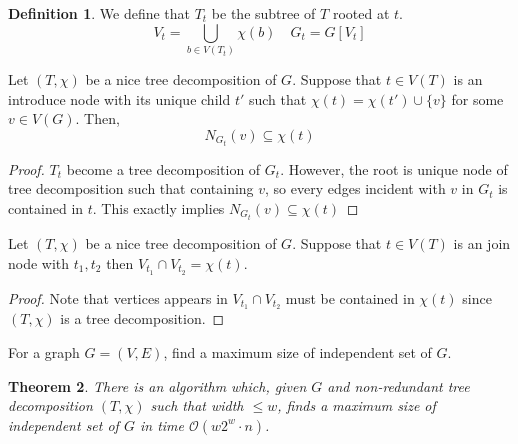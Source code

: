 \documentclass[12pt, a4paper, openany, twoside]{book}
\newtheorem{thm}{Theorem}[chapter]
\theoremstyle{definition}
\newtheorem{defn}[thm]{Definition}
\theoremstyle{remark}
\newcommand{\CO}{{\mathcal {O}}} \newcommand{\CP}{{\mathcal {P}}}
\theoremstyle{plain}
\numberwithin{equation}{section}
\begin{document}
\begin{defn}
    We define that $T_t$ be the subtree of $T$ rooted at $t$. 
    \[V_t = \bigcup_{b \in V(T_t)} \chi(b) \quad G_t = G[V_t]\]
\end{defn}

\begin{tcolorbox}[colback=yellow!10!white,colframe=blue!75!black,title=Lemma]

Let $(T, \chi)$ be a nice tree decomposition of $G$. Suppose that $t \in V(T)$ is an 
introduce node with its unique child $t'$ such that $\chi(t) = \chi(t') \cup \{v\}$ for some $v \in V(G)$. 
Then, 
\[N_{G_t}(v) \subseteq \chi(t)\]

\end{tcolorbox}

\begin{proof}
    $T_t$ become a tree decomposition of $G_t$. However, the root is unique node of tree decomposition 
    such that containing $v$, so every edges incident with $v$ in $G_t$ is contained in $t$. This 
    exactly implies $N_{G_t}(v) \subseteq \chi(t)$
\end{proof}

\begin{tcolorbox}[colback=yellow!10!white,colframe=blue!75!black,title=Lemma]

Let $(T, \chi)$ be a nice tree decomposition of $G$. Suppose that $t \in V(T)$ is an 
join node with $t_1, t_2$ then $V_{t_1} \cap V_{t_2} = \chi(t)$. 

\end{tcolorbox}

\begin{proof}
    Note that vertices appears in $V_{t_1} \cap V_{t_2}$ must be contained in $\chi(t)$ since 
    $(T, \chi)$ is a tree decomposition. 
\end{proof}

\begin{tcolorbox}[colback=yellow!10!white,colframe=red!75!black,title=Maximum Independent Set]

For a graph $G = (V, E)$, find a maximum size of independent set of $G$. 

\end{tcolorbox}

\begin{thm}
There is an algorithm which, given $G$ and non-redundant tree decomposition $(T, \chi)$ such that width $\leq w$, 
finds a maximum size of independent set of $G$ in time $\CO(w2^w \cdot n)$. 
\end{thm}
\end{document}
